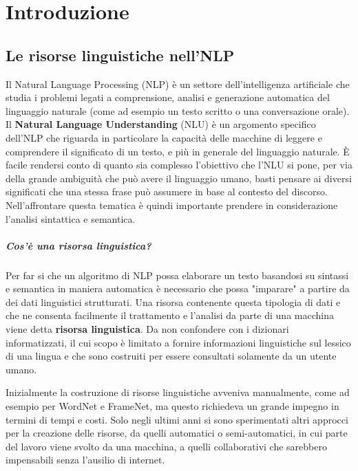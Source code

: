 
\chapter{Introduzione}


\section{Le risorse linguistiche nell'NLP}
Il Natural Language Processing (NLP) è un settore dell'intelligenza artificiale
che studia i problemi legati a comprensione, analisi e generazione automatica del
linguaggio naturale (come ad esempio un testo scritto o una conversazione orale).
Il \textbf{Natural Language Understanding} (NLU) \cite{navigli2018natural} è un argomento
specifico dell'NLP che riguarda in particolare la capacità delle macchine di leggere
e comprendere il significato di un testo, e più in generale del linguaggio naturale.
È facile rendersi conto di quanto sia complesso l'obiettivo che l'NLU si pone,
per via della grande ambiguità che può avere il linguaggio umano, basti pensare
ai diversi significati che una stessa frase può assumere in base al contesto del
discorso.
Nell'affrontare questa tematica è quindi importante prendere in considerazione
l'analisi sintattica e semantica.

\paragraph{Cos'è una risorsa linguistica?}
Per far si che un algoritmo di NLP possa elaborare un testo basandosi su sintassi
e semantica in maniera automatica è necessario che possa "imparare" a partire
da dei dati linguistici strutturati.
Una risorsa contenente questa tipologia di dati e che ne consenta facilmente il
trattamento e l'analisi da parte di una macchina viene detta \textbf{risorsa linguistica}.
Da non confondere con i dizionari informatizzati, il cui scopo è limitato a
fornire informazioni linguistiche sul lessico di una lingua e che sono costruiti
per essere consultati solamente da un utente umano.

Inizialmente la costruzione di risorse linguistiche avveniva manualmente, come
ad esempio per WordNet e FrameNet, ma questo richiedeva un grande impegno in
termini di tempi e costi.
Solo negli ultimi anni si sono sperimentati altri approcci per la creazione
delle risorse, da quelli automatici o semi-automatici, in cui parte del lavoro
viene svolto da una macchina, a quelli collaborativi che sarebbero impensabili
senza l'ausilio di internet.

